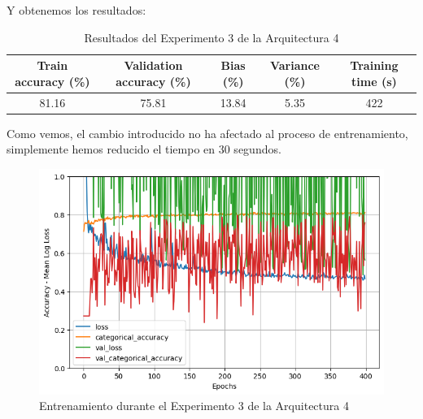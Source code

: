 \documentclass{article}
\begin{document}
			Y obtenemos los resultados:
			\begin{table}[!h]
				\begin{center}
					\begin{tabular}{| c | c | c | c | c |}
						\textbf{Train accuracy (\%)} & \textbf{Validation accuracy (\%)} & \textbf{Bias (\%)} & \textbf{Variance (\%)} & \textbf{Training time (s)} \\ \hline
						81.16 & 75.81 & 13.84 & 5.35 & 422 \\ \hline
					\end{tabular}
					\caption{Resultados del Experimento 3 de la Arquitectura 4}
					\label{tab:res-d-a4-e3}
				\end{center}
			\end{table}
			
			Como vemos, el cambio introducido no ha afectado al proceso de entrenamiento, simplemente hemos reducido el tiempo en 30 segundos.
			\begin{figure}[!h]
				\begin{center}
					\includegraphics[scale=0.5]{d-tr-a4-e3.png}		
					\caption{Entrenamiento durante el Experimento 3 de la Arquitectura 4}	
					\label{d-tr-a4-e3}
				\end{center}
			\end{figure}
			
\end{document}
